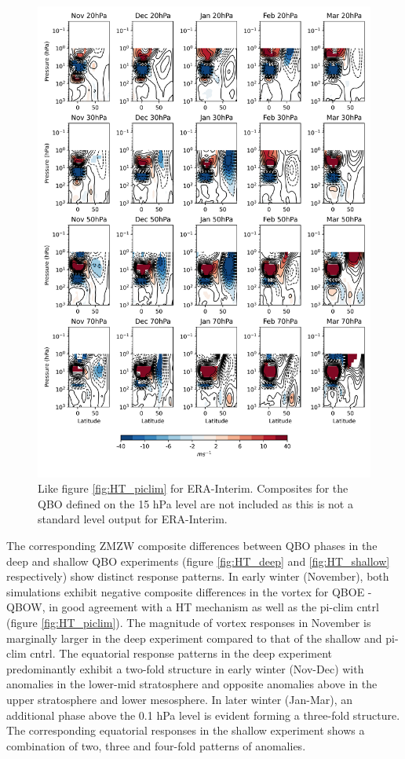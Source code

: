 \newpage 
\begin{figure}[h!]
\begin{center}
\noindent\includegraphics[width = 0.85\linewidth]{Figures/Figures-deepQBO/LAGGED_ZMZW_composites_by_month_QBO_phases_U_ERA_MarQBO_vs_Mar_70hPa_5thresh.png}
\caption[ZMZW composites under QBO phases in ERA-Interim]{Like figure \ref{fig:HT_piclim} for ERA-Interim. Composites for the QBO defined on the 15 hPa level are not included as this is not a standard level output for ERA-Interim. }
\label{fig:HT_ERA}
\end{center}
\end{figure}

The corresponding ZMZW composite differences between QBO phases in the deep and shallow QBO experiments (figure \ref{fig:HT_deep} and \ref{fig:HT_shallow} respectively) show distinct response patterns. In early winter (November), both simulations exhibit negative composite differences in the vortex for QBOE - QBOW, in good agreement with a HT mechanism \citep{HoltonJamesRTan1980} as well as the pi-clim cntrl (figure \ref{fig:HT_piclim}). The magnitude of vortex responses in November is marginally larger in the deep experiment compared to that of the shallow and pi-clim cntrl. The equatorial response patterns in the deep experiment predominantly exhibit a two-fold structure in early winter (Nov-Dec) with anomalies in the lower-mid stratosphere and opposite anomalies above in the upper stratosphere and lower mesosphere. In later winter (Jan-Mar), an additional phase above the 0.1 hPa level is evident forming a three-fold structure. The corresponding equatorial responses in the shallow experiment shows a combination of two, three and four-fold patterns of anomalies. 

